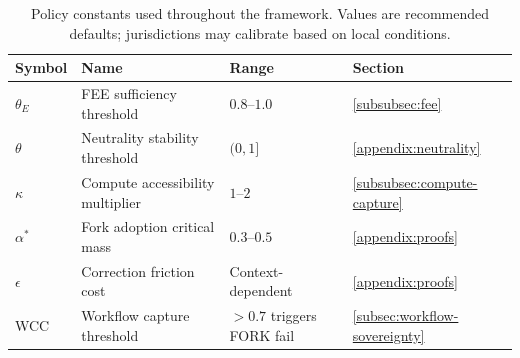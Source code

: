 \documentclass{article}
\begin{document}
\begin{table}[htbp]
\centering
\small
\caption{Policy constants used throughout the framework. Values are recommended defaults; jurisdictions may calibrate based on local conditions.}
\label{tab:policy-constants}
\begin{tabular}{@{}llll@{}}
\toprule
\textbf{Symbol} & \textbf{Name} & \textbf{Range} & \textbf{Section} \\
\midrule
$\theta_E$ & FEE sufficiency threshold & $0.8$--$1.0$ & \ref{subsubsec:fee} \\
$\theta$ & Neutrality stability threshold & $(0, 1]$ & \ref{appendix:neutrality} \\
$\kappa$ & Compute accessibility multiplier & $1$--$2$ & \ref{subsubsec:compute-capture} \\
$\alpha^*$ & Fork adoption critical mass & $0.3$--$0.5$ & \ref{appendix:proofs} \\
$\epsilon$ & Correction friction cost & Context-dependent & \ref{appendix:proofs} \\
WCC & Workflow capture threshold & $> 0.7$ triggers FORK fail & \ref{subsec:workflow-sovereignty} \\
\bottomrule
\end{tabular}
\end{table}
\end{document}

